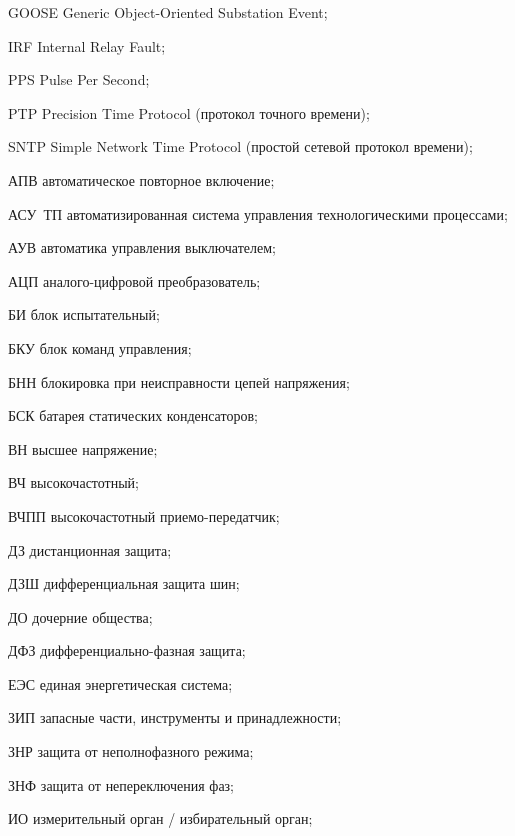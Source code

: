\begin{list}{}%
{%
  \setlength{\labelwidth}{\abbrwidth}%
  \setlength{\labelsep}{0pt}%
  \setlength{\leftmargin}{\dimexpr\labelwidth+\labelsep\relax}%
  \setlength{\itemindent}{0pt}%
  \setlength{\parsep}{0pt}%
  \setlength{\itemsep}{0pt}
  \renewcommand{\makelabel}[1]{#1 --\hspace{\abbrgap}}%
}
\item[GOOSE] Generic Object-Oriented Substation Event;
\item[IRF] Internal Relay Fault;
\item[PPS] Pulse Per Second;
\item[PTP] Precision Time Protocol (протокол точного времени);
\item[SNTP] Simple Network Time Protocol (простой сетевой протокол времени);
\item[АПВ] автоматическое повторное включение;
\item[АСУ~ТП] автоматизированная система управления технологическими процессами;
\item[АУВ] автоматика управления выключателем;
\item[АЦП] аналого-цифровой преобразователь;
\item[БИ] блок испытательный;
\item[БКУ] блок команд управления;
\item[БНН] блокировка при неисправности цепей напряжения;
\item[БСК] батарея статических конденсаторов;
\item[ВН] высшее напряжение;
\item[ВЧ] высокочастотный;
\item[ВЧПП] высокочастотный приемо-передатчик;
\item[ДЗ] дистанционная защита;
\item[ДЗШ] дифференциальная защита шин;
\item[ДО] дочерние общества;
\item[ДФЗ] дифференциально-фазная защита;
\item[ЕЭС] единая энергетическая система;
\item[ЗИП] запасные части, инструменты и принадлежности;
\item[ЗНР] защита от неполнофазного режима;
\item[ЗНФ] защита от непереключения фаз;
\item[ИО] измерительный орган / избирательный орган;

\end{list}
